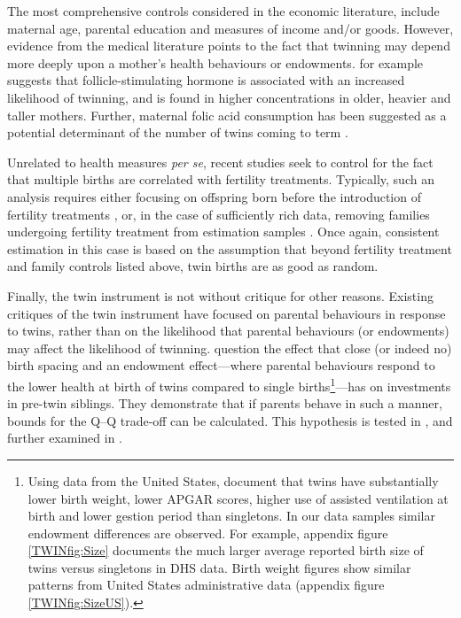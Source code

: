 \documentclass[subeqn]{article}
\begin{document}
\begin{spacing}{1.4}
The most comprehensive controls considered in the economic literature, include
maternal age, parental education and measures of income and/or goods.  However,
evidence from the medical literature points to the fact that twinning may
depend more deeply upon a mother's health behaviours or endowments. \citet{Hall2003}
for example suggests that follicle-stimulating hormone is associated with
an increased likelihood of twinning, and is found in higher concentrations in
older, heavier and taller mothers. Further, maternal folic acid consumption
has been suggested as a potential determinant of the number of twins coming to
term \citet{Lietal2003}.

Unrelated to health measures \emph{per se}, recent studies seek to control for 
the fact that multiple births are correlated with fertility treatments. 
Typically, such an analysis requires either focusing on offspring born before
the introduction of fertility treatments \citep{Caceres2006,Angristetal2010}, 
or, in the case of sufficiently rich data, removing families undergoing fertility 
treatment from estimation samples \citep{Braakman2014}. Once again, consistent 
estimation in this case is based on the assumption that beyond fertility 
treatment and family controls listed above, twin births are as good as random.

Finally, the twin instrument is not without critique for other reasons. Existing
critiques of the twin instrument have focused on parental behaviours in response 
to twins, rather than on the likelihood that parental behaviours (or endowments) 
may affect the likelihood of twinning. \citet{RosenzweigZhang2009} question the 
effect that close (or indeed no) birth spacing and an endowment effect---where 
parental behaviours respond to the lower health at birth of twins compared to 
single births\footnote{Using data from the United States, \citet{Almondetal2005} 
document that twins have substantially lower birth weight, lower APGAR scores, 
higher use of assisted ventilation at birth and lower gestion period than 
singletons. In our data samples similar endowment differences are observed. For
example, appendix figure \ref{TWINfig:Size} documents the much larger average 
reported birth size of twins versus singletons in DHS data. Birth weight figures 
show similar patterns from United States administrative data (appendix figure
\ref{TWINfig:SizeUS}).}---has on investments in pre-twin siblings. They 
demonstrate that if parents behave in such a manner, bounds for the Q--Q 
trade-off can be calculated. This hypothesis is tested in 
\citet{Angristetal2010}, and further examined in \citet{FitzsimonsMalde2014}. 



\end{spacing}
\end{document}
